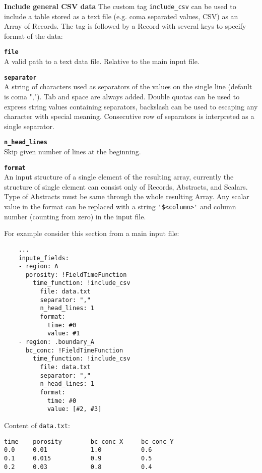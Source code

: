 {\bf Include general CSV data}
The custom tag \verb'include_csv' can be used to include a table stored as a text file (e.g. coma separated values, CSV) as an Array of Records. 
The tag is followed by a Record with several keys to specify format of the data:
\begin{description}
  \item {\bf\verb'file'} \\A valid path to a text data file. Relative to the main input file.
  \item {\bf\verb'separator'}\\ A string of characters used as separators of the values on the single line (default is coma ",").
  Tab and space are always added. Double quotas can be used to express string values containing separators, 
  backslash can be used to escaping any character with special meaning. Consecutive row of separators is interpreted as a single separator. 
  \item {\bf\verb'n_head_lines'}\\ Skip given number of lines at the beginning.
  \item {\bf\verb'format'}\\ An input structure of a single element of the resulting array, currently the structure of single element 
  can consist only of Records, Abstracts, and Scalars. Type of Abstracts must be same through the whole resulting Array. Any scalar value in the format
  can be replaced with a string \verb"'$<column>'"  and column number (counting from zero) in the input file.
\end{description}

For example consider this section from a main input file:
\begin{verbatim}
    ...
    inpute_fields:
    - region: A
      porosity: !FieldTimeFunction
        time_function: !include_csv
          file: data.txt  
          separator: ","
          n_head_lines: 1
          format: 
            time: #0
            value: #1
    - region: .boundary_A        
      bc_conc: !FieldTimeFunction
        time_function: !include_csv
          file: data.txt  
          separator: ","
          n_head_lines: 1
          format: 
            time: #0
            value: [#2, #3]
\end{verbatim}
Content of \verb'data.txt':
\begin{verbatim}
time    porosity        bc_conc_X     bc_conc_Y
0.0     0.01            1.0           0.6
0.1     0.015           0.9           0.5
0.2     0.03            0.8           0.4
\end{verbatim}

